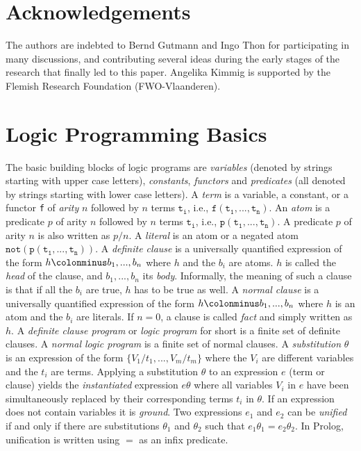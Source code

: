 \documentclass[a4paper]{article}
\begin{document}
\section*{Acknowledgements}
The authors are indebted to Bernd Gutmann and Ingo Thon
for participating in many discussions, and contributing several ideas  during the early stages of the research that finally led to this paper. 
Angelika Kimmig is supported by the Flemish Research Foundation (FWO-Vlaanderen). 







\appendix

\section{Logic Programming Basics}
\label{app:lp}
The basic building blocks of logic programs are \emph{variables} (denoted by strings starting with upper case letters), \emph{constants}, \emph{functors} and
\emph{predicates} (all denoted by strings starting with lower case letters).  A \emph{term} is a variable, a constant, or a functor
\texttt{f} of \emph{arity} $n$ followed by $n$ terms $\mathtt{t_i}$, i.e.,
$\mathtt{f(t_1,...,t_n)}$. 
An \emph{atom} is a predicate $p$ of arity $n$ followed by $n$ terms $\mathtt{t_i}$, i.e.,
$\mathtt{p(t_1,...,t_n)}$. A predicate $p$ of arity $n$ is also written as $p/n$. A \emph{literal} is an
atom or a negated atom $\mathtt{not(p(t_1,...,t_n))}$. A \emph{definite
  clause} is a universally quantified expression of the form $h
\colonminus b_1, ... , b_n$ where $h$ and the $b_i$ are atoms.
$h$ is called the \emph{head} of the clause, and $b_1, ... , b_n$ its
\emph{body}. Informally, the meaning of such a clause is that if all
the $b_i$ are true, $h$ has to be true as well. 
 A
\emph{normal clause}  is a universally quantified expression of the form $h
\colonminus b_1, ... , b_n$ where $h$ is an atom and the $b_i$ are
literals.
If $n=0$, a clause is called \emph{fact} and simply written
as $h$. A \emph{definite clause program} or \emph{logic program} for
short is a finite set of definite clauses. A \emph{normal logic
  program} is a finite set of normal clauses. 
A \emph{substitution} $\theta$ is an expression of the form
$\{V_1/t_1,...,V_m/t_m\}$ where the $V_i$ are different variables and
the $t_i$ are terms. Applying a substitution $\theta$ to an expression
$e$ (term or clause) yields the \emph{instantiated} expression $e\theta$
where all variables $V_i$ in $e$ have been simultaneously replaced by
their corresponding terms $t_i$ in $\theta$. If an expression does not
contain variables it is \emph{ground}. Two expressions $e_1$ and $e_2$ can be \emph{unified} if and only if there are substitutions $\theta_1$ and $\theta_2$ such that $e_1\theta_1 = e_2\theta_2$. In Prolog, unification is written using $=$ as an infix predicate. 
\end{document}
